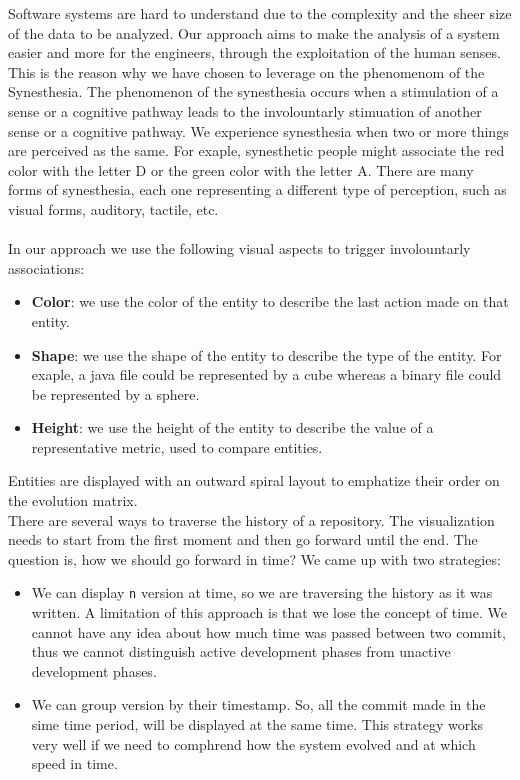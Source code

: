 Software systems are hard to understand due to the complexity and the sheer size of the data to be analyzed.
Our approach aims to make the analysis of a system easier and more for the engineers, through the exploitation of the human senses.
This is the reason why we have chosen to leverage on the phenomenom of the Synesthesia.
The phenomenon of the synesthesia occurs  when a stimulation of a sense or a cognitive pathway leads to the involountarly stimuation of another sense or a cognitive pathway.
We experience synesthesia when two or more things are perceived as the same. 
For exaple, synesthetic people might associate the red color with the letter D or the green color with the letter A. 
There are many forms of synesthesia, each one representing a different type of perception, such as visual forms, auditory, tactile, etc.\\
\\
In our approach we use the following visual aspects to trigger involountarly associations:
\begin{itemize}
    \item \textbf{Color}: we use the color of the entity to describe the last action made on that entity.
    \item \textbf{Shape}: we use the shape of the entity to describe the type of the entity. 
    For exaple, a java file could be represented by a cube whereas a binary file could be represented by a sphere.
    \item \textbf{Height}: we use the height of the entity to describe the value of a representative metric, used to compare entities.
\end{itemize}

Entities are displayed with an outward spiral layout to emphatize their order on the evolution matrix. \\

There are several ways to traverse the history of a repository. 
The visualization needs to start from the first moment and then go forward until the end. The question is, how we should go forward in time?
We came up with two strategies: 
\begin{itemize}
    \item We can display \texttt{n} version at time, so we are traversing the history as it was written. 
    A limitation of this approach is that we lose the concept of time. 
    We cannot have any idea about how much time was passed between two commit, thus we cannot distinguish active development phases from unactive development phases. 

    \item We can group version by their timestamp. So, all the commit made in the sime time period, will be displayed at the same time. 
    This strategy works very well if we need to comphrend how the system evolved and at which speed in time. 
\end{itemize}


